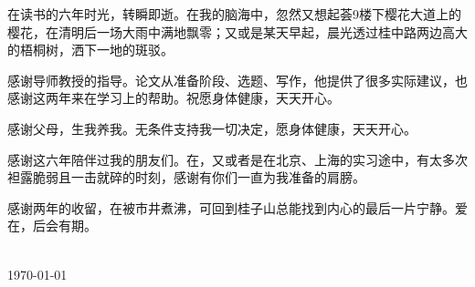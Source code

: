 
\acknowledgements
在读书的六年时光，转瞬即逝。在我的脑海中，忽然又想起荟9楼下樱花大道上的樱花，在清明后一场大雨中满地飘零；又或是某天早起，晨光透过桂中路两边高大的梧桐树，洒下一地的斑驳。

感谢导师教授的指导。论文从准备阶段、选题、写作，他提供了很多实际建议，也感谢这两年来在学习上的帮助。祝愿身体健康，天天开心。

感谢父母，生我养我。无条件支持我一切决定，愿身体健康，天天开心。

感谢这六年陪伴过我的朋友们。在，又或者是在北京、上海的实习途中，有太多次袒露脆弱且一击就碎的时刻，感谢有你们一直为我准备的肩膀。

感谢两年的收留，在被市井煮沸，可回到桂子山总能找到内心的最后一片宁静。爱在，后会有期。



\begin{signature}
  \blind{} \\
  \today 
\end{signature}